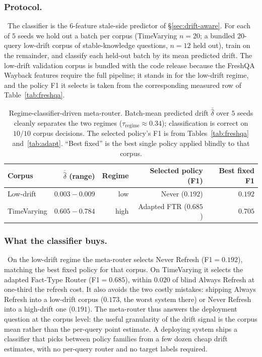 \documentclass[pdflatex,sn-basic]{sn-jnl}
\begin{document}
\subsubsection*{Protocol.}~The classifier is the $6$-feature stale-side predictor of §\ref{sec:drift-aware}. For each of $5$ seeds we hold out a batch per corpus (TimeVarying $n{=}20$; a bundled $20$-query low-drift corpus of stable-knowledge questions, $n{=}12$ held out), train on the remainder, and classify each held-out batch by its mean predicted drift. The low-drift validation corpus is bundled with the code release because the FreshQA Wayback features require the full pipeline; it stands in for the low-drift regime, and the policy F1 it selects is taken from the corresponding measured row of Table~\ref{tab:freshqa}.

\begin{table}[htbp]
\caption{Regime-classifier-driven meta-router. Batch-mean predicted drift $\overline{\hat\delta}$ over $5$ seeds cleanly separates the two regimes ($\tau_{\text{regime}}\approx0.34$); classification is correct on $10/10$ corpus decisions. The selected policy's F1 is from Tables~\ref{tab:freshqa} and~\ref{tab:adapt}. ``Best fixed'' is the best single policy applied blindly to that corpus.}
\label{tab:regime}
\centering
\begin{tabular}{lrrrr}
\toprule
Corpus & $\overline{\hat\delta}$ (range) & Regime & Selected policy (F1) & Best fixed F1 \\
\midrule
Low-drift       & $0.003{-}0.009$ & low  & Never ($0.192$)   & $0.192$ \\
TimeVarying     & $0.605{-}0.784$ & high & Adapted FTR ($0.685$) & $0.705$ \\
\bottomrule
\end{tabular}
\end{table}

\subsubsection*{What the classifier buys.}~On the low-drift regime the meta-router selects Never Refresh (F1$=0.192$), matching the best fixed policy for that corpus. On TimeVarying it selects the adapted Fact-Type Router (F1$=0.685$), within $0.020$ of blind Always Refresh at one-third the refresh cost. It also avoids the two costly mistakes: shipping Always Refresh into a low-drift corpus ($0.173$, the worst system there) or Never Refresh into a high-drift one ($0.191$). The meta-router thus answers the deployment question at the corpus level: the useful granularity of the drift signal is the corpus mean rather than the per-query point estimate. A deploying system ships a classifier that picks between policy families from a few dozen cheap drift estimates, with no per-query router and no target labels required.
\end{document}
